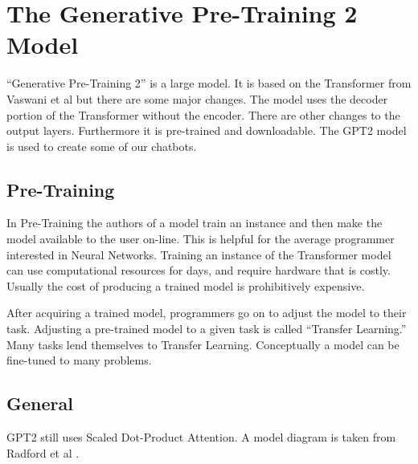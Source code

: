 \section{The Generative Pre-Training 2 Model}

\label{pre-trining-2-model}

``Generative Pre-Training 2'' is a large model. It is based on the Transformer from Vaswani et al \cite{Vaswani2017AttentionIA} but there are some major changes. The model uses the decoder portion of the Transformer without the encoder. There are other changes to the output layers. Furthermore it is pre-trained and downloadable. The GPT2 model is used to create some of our chatbots.


\subsection{Pre-Training}
In Pre-Training the authors of a model train an instance and then make the model available to the user on-line. This is helpful for the average programmer interested in Neural Networks. Training an instance of the Transformer model can use computational resources for days, and require hardware that is costly. Usually the cost of producing a trained model is prohibitively expensive.

After acquiring a trained model, programmers go on to adjust the model to their task. Adjusting a pre-trained model to a given task is called ``Transfer Learning.'' Many tasks lend themselves to Transfer Learning. Conceptually a model can be fine-tuned to many problems. %


\subsection{General}
\ac{GPT2} still uses Scaled Dot-Product Attention. A model diagram is taken from Radford et al \cite{radford2018improving}. 

